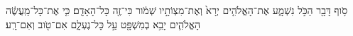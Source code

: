 \documentclass{openreader}
\begin{document}
סֹ֥וף דָּבָ֖ר הַכֹּ֣ל נִשְׁמָ֑ע אֶת־הָאֱלֹהִ֤ים יְרָא֙ וְאֶת־מִצְוֹתָ֣יו שְׁמֹ֔ור כִּי־זֶ֖ה כָּל־הָאָדָֽם׃ 
כִּ֤י אֶת־כָּל־מַֽעֲשֶׂ֔ה הָאֱלֹהִ֛ים יָבִ֥א בְמִשְׁפָּ֖ט עַ֣ל כָּל־נֶעְלָ֑ם אִם־טֹ֖וב וְאִם־רָֽע׃ 
\end{document}
